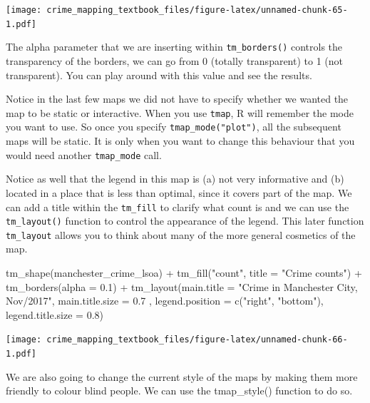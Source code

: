 \documentclass[
]{book}
\newenvironment{Shaded}{\begin{snugshade}}{\end{snugshade}}
\newcommand{\AttributeTok}[1]{\textcolor[rgb]{0.77,0.63,0.00}{#1}}
\newcommand{\FloatTok}[1]{\textcolor[rgb]{0.00,0.00,0.81}{#1}}
\newcommand{\FunctionTok}[1]{\textcolor[rgb]{0.00,0.00,0.00}{#1}}
\newcommand{\NormalTok}[1]{#1}
\newcommand{\SpecialCharTok}[1]{\textcolor[rgb]{0.00,0.00,0.00}{#1}}
\newcommand{\StringTok}[1]{\textcolor[rgb]{0.31,0.60,0.02}{#1}}
\begin{document}
\texttt{[image: crime\_mapping\_textbook\_files/figure-latex/unnamed-chunk-65-1.pdf]}

The alpha parameter that we are inserting within \texttt{tm\_borders()} controls the transparency of the borders, we can go from 0 (totally transparent) to 1 (not transparent). You can play around with this value and see the results.

Notice in the last few maps we did not have to specify whether we wanted the map to be static or interactive. When you use \texttt{tmap}, R will remember the mode you want to use. So once you specify \texttt{tmap\_mode("plot")}, all the subsequent maps will be static. It is only when you want to change this behaviour that you would need another \texttt{tmap\_mode} call.

Notice as well that the legend in this map is (a) not very informative and (b) located in a place that is less than optimal, since it covers part of the map. We can add a title within the \texttt{tm\_fill} to clarify what count is and we can use the \texttt{tm\_layout()} function to control the appearance of the legend. This later function \texttt{tm\_layout} allows you to think about many of the more general cosmetics of the map.

\begin{Shaded}
\begin{Highlighting}[]
\FunctionTok{tm\_shape}\NormalTok{(manchester\_crime\_lsoa) }\SpecialCharTok{+} 
  \FunctionTok{tm\_fill}\NormalTok{(}\StringTok{"count"}\NormalTok{, }\AttributeTok{title =} \StringTok{"Crime counts"}\NormalTok{) }\SpecialCharTok{+}
  \FunctionTok{tm\_borders}\NormalTok{(}\AttributeTok{alpha =} \FloatTok{0.1}\NormalTok{) }\SpecialCharTok{+}
  \FunctionTok{tm\_layout}\NormalTok{(}\AttributeTok{main.title =} \StringTok{"Crime in Manchester City, Nov/2017"}\NormalTok{, }\AttributeTok{main.title.size =} \FloatTok{0.7}\NormalTok{ ,}
            \AttributeTok{legend.position =} \FunctionTok{c}\NormalTok{(}\StringTok{"right"}\NormalTok{, }\StringTok{"bottom"}\NormalTok{), }\AttributeTok{legend.title.size =} \FloatTok{0.8}\NormalTok{)}
\end{Highlighting}
\end{Shaded}

\texttt{[image: crime\_mapping\_textbook\_files/figure-latex/unnamed-chunk-66-1.pdf]}

We are also going to change the current style of the maps by making them more friendly to colour blind people. We can use the tmap\_style() function to do so.
\end{document}
